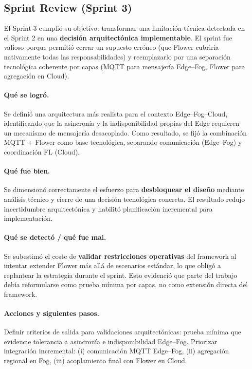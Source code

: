 \documentclass{report}
\begin{document}
\subsection{Sprint Review (Sprint 3)}
El Sprint 3 cumplió su objetivo: transformar una limitación técnica detectada en el Sprint 2 en una \textbf{decisión arquitectónica implementable}. El sprint fue valioso porque permitió cerrar un supuesto erróneo (que Flower cubriría nativamente todas las responsabilidades) y reemplazarlo por una separación tecnológica coherente por capas (MQTT para mensajería Edge--Fog, Flower para agregación en Cloud).

\vspace{0.15em}
\paragraph{Qué se logró.}
Se definió una arquitectura más realista para el contexto Edge--Fog--Cloud, identificando que la asincronía y la indisponibilidad propias del Edge requieren un mecanismo de mensajería desacoplado. Como resultado, se fijó la combinación MQTT + Flower como base tecnológica, separando comunicación (Edge--Fog) y coordinación FL (Cloud).

\vspace{0.15em}
\paragraph{Qué fue bien.}
Se dimensionó correctamente el esfuerzo para \textbf{desbloquear el diseño} mediante análisis técnico y cierre de una decisión tecnológica concreta. El resultado redujo incertidumbre arquitectónica y habilitó planificación incremental para implementación.

\vspace{0.15em}
\paragraph{Qué se detectó / qué fue mal.}
Se subestimó el coste de \textbf{validar restricciones operativas} del framework al intentar extender Flower más allá de escenarios estándar, lo que obligó a replantear la estrategia durante el sprint. Esto evidenció que parte del trabajo debía reformularse como prueba mínima por capas, no como extensión directa del framework.

\vspace{0.15em}
\paragraph{Acciones y siguientes pasos.}
Definir criterios de salida para validaciones arquitectónicas: prueba mínima que evidencie tolerancia a asincronía e indisponibilidad Edge--Fog. Priorizar integración incremental: (i) comunicación MQTT Edge--Fog, (ii) agregación regional en Fog, (iii) acoplamiento final con Flower en Cloud.
\end{document}

